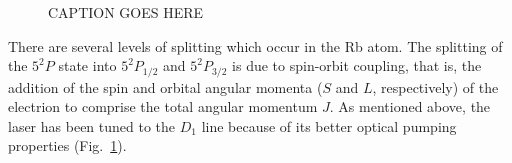 \begin{figure}[h]
\begin{center}
\hspace{-1mm}
\vspace{-2mm}
\vspace{-2mm}
\caption{\small{CAPTION GOES HERE}}
\label{fig:8587levels}
\end{center}
\end{figure}

There are several levels of splitting which occur in the Rb atom. The
splitting of the $5^2P$ state into $5^2P_{1/2}$ and $5^2P_{3/2}$ is
due to spin-orbit coupling, that is, the addition of the spin and
orbital angular momenta ($S$ and $L$, respectively) of the electrion
to comprise the total angular momentum $J$. As mentioned above, the
laser has been tuned to the $D_1$ line because of its better optical
pumping properties (Fig.~\ref{fig:8587levels}).

